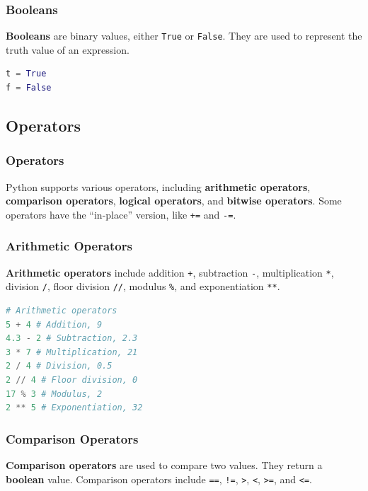 \documentclass[beamer, en, version=2.0]{huangfusl-template}
\begin{document}
    \begin{frame}[fragile]
        \frametitle{Booleans}

        \textbf{Booleans} are binary values, either {\footnotesize\verb|True|} or {\footnotesize\verb|False|}. They are used to represent the truth value of an expression.

\begin{lstlisting}[language=python]
t = True
f = False
\end{lstlisting}
    \end{frame}
    \subsection{Operators}
    \begin{frame}[fragile]
        \frametitle{Operators}

        Python supports various operators, including \textbf{arithmetic operators}, \textbf{comparison operators}, \textbf{logical operators}, and \textbf{bitwise operators}. Some operators have the ``in-place'' version, like {\footnotesize\verb|+=|} and {\footnotesize\verb|-=|}.

    \end{frame}
    \begin{frame}[fragile]
        \frametitle{Arithmetic Operators}

        \textbf{Arithmetic operators} include addition {\footnotesize\verb|+|}, subtraction {\footnotesize\verb|-|}, multiplication {\footnotesize\verb|*|}, division {\footnotesize\verb|/|}, floor division {\footnotesize\verb|//|}, modulus {\footnotesize\verb|%|}, and exponentiation {\footnotesize\verb|**|}.

\begin{lstlisting}[language=python]
# Arithmetic operators
5 + 4 # Addition, 9
4.3 - 2 # Subtraction, 2.3
3 * 7 # Multiplication, 21
2 / 4 # Division, 0.5
2 // 4 # Floor division, 0
17 % 3 # Modulus, 2
2 ** 5 # Exponentiation, 32
\end{lstlisting}
    \end{frame}
    \begin{frame}[fragile]
        \frametitle{Comparison Operators}

        \textbf{Comparison operators} are used to compare two values. They return a \textbf{boolean} value. Comparison operators include {\color{darkred}\footnotesize\verb|==|}, {\footnotesize\verb|!=|}, {\footnotesize\verb|>|}, {\footnotesize\verb|<|}, {\footnotesize\verb|>=|}, and {\footnotesize\verb|<=|}.
    \end{frame}
\end{document}
